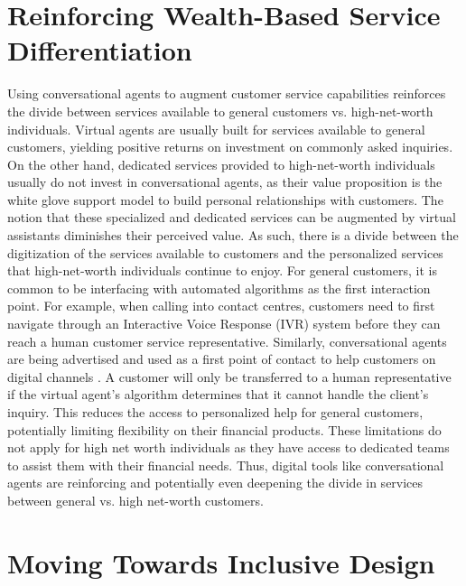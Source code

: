 \documentclass{sigchi-ext}
\begin{document}
\section{Reinforcing Wealth-Based Service Differentiation}

Using conversational agents to augment customer service capabilities reinforces the divide between services available to general customers vs. high-net-worth individuals. Virtual agents are usually built for services available to general customers, yielding positive returns on investment on commonly asked inquiries. On the other hand, dedicated services provided to high-net-worth individuals usually do not invest in conversational agents, as their value proposition is the white glove support model to build personal relationships with customers. The notion that these specialized and dedicated services can be augmented by virtual assistants diminishes their perceived value. As such, there is a divide between the digitization of the services available to customers and the personalized services that high-net-worth individuals continue to enjoy. For general customers, it is common to be interfacing with automated algorithms as the first interaction point. For example, when calling into contact centres, customers need to first navigate through an Interactive Voice Response (IVR) system before they can reach a human customer service representative. Similarly, conversational agents are being advertised and used as a first point of contact to help customers on digital channels \cite{revechat}. A customer will only be transferred to a human representative if the virtual agent's algorithm determines that it cannot handle the client's inquiry. This reduces the access to personalized help for general customers, potentially limiting flexibility on their financial products. These limitations do not apply for high net worth individuals as they have access to dedicated teams to assist them with their financial needs. Thus, digital tools like conversational agents are reinforcing and potentially even deepening the divide in services between general vs. high net-worth customers.


\section{Moving Towards Inclusive Design}
\end{document}
